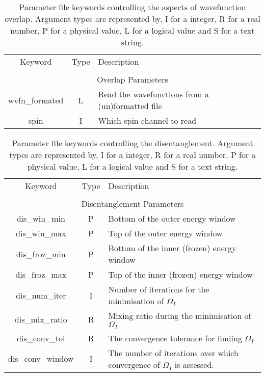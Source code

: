 \begin{table}
\begin{center}
\begin{tabular}{|c|c|p{6cm}|}
\hline
Keyword & Type & Description \\
        &      &             \\
\hline\hline
\multicolumn{3}{|c|}{Overlap Parameters} \\
\hline
{\sc wvfn\_formated }   & L & Read the wavefunctions from a  (un)formatted file  \\
{\sc spin }   & I & Which spin channel to read \\
\hline
\end{tabular}
\caption
{Parameter file keywords controlling the aspects of wavefunction overlap.  Argument types
are represented by, I for a integer, R for a real number, P for a
physical value, L for a logical value and S for a text string.}
\label{parameter_keywords2}
\end{center}
\end{table}



\begin{table}
\begin{center}
\begin{tabular}{|c|c|p{6cm}|}
\hline
Keyword & Type & Description \\
        &      &             \\
\hline\hline
\multicolumn{3}{|c|}{Disentanglement Parameters} \\
\hline
{\sc dis\_win\_min }   & P & Bottom of the outer energy window \\
{\sc dis\_win\_max }   & P & Top of the outer energy window \\
{\sc dis\_froz\_min }   & P & Bottom of the inner (frozen) energy window \\
{\sc dis\_froz\_max }   & P & Top of the inner (frozen) energy window \\
{\sc dis\_num\_iter }   & I & Number of iterations for the minimisation
of $\Omega_{I}$ \\
{\sc dis\_mix\_ratio }   & R & Mixing ratio during the minimisation of $\Omega_{I}$\\
{\sc dis\_conv\_tol }   & R & The convergence tolerance for finding $\Omega_{I}$ \\
{\sc dis\_conv\_window }   & I & The number of iterations over which
convergence of $\Omega_{I}$ is assessed. \\ 
\hline
\end{tabular}
\caption[Parameter file keywords controlling disentanglement parameters.]
{Parameter file keywords controlling the disentanglement.  Argument types
are represented by, I for a integer, R for a real number, P for a
physical value, L for a logical value and S for a text string.}
\label{parameter_keywords4}
\end{center}
\end{table}



